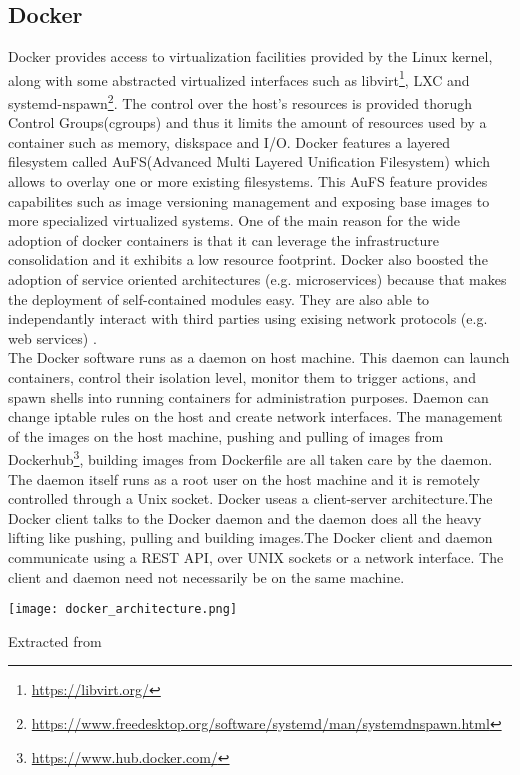 \subsection{Docker}
Docker provides access to virtualization facilities provided by the Linux kernel, along with some abstracted virtualized interfaces such as libvirt\footnote{\url{https://libvirt.org/}}, LXC and systemd-nspawn\footnote{\url{https://www.freedesktop.org/software/systemd/man/systemdnspawn.html}}. The control over the host's resources is provided thorugh Control Groups(cgroups) and thus it limits the amount of resources used by a container such as memory, diskspace and I/O. Docker features a layered filesystem called AuFS(Advanced Multi Layered Unification Filesystem) which allows to overlay one or more existing filesystems. This AuFS feature provides capabilites such as image versioning management and exposing base images to more specialized virtualized systems. One of the main reason for the wide adoption of docker containers is that it can leverage the infrastructure consolidation and it exhibits a low resource footprint. Docker also boosted the adoption of service oriented architectures (e.g. microservices) because that makes the deployment of self-contained modules easy. They are also able to independantly interact with third parties using exising network protocols (e.g. web services) \cite{Xavier:2013:PEC:2497369.2497577}. \\

The Docker software runs as a daemon on host machine. This daemon can launch containers, control their isolation level, monitor them to trigger actions, and spawn shells into running containers for administration purposes. Daemon can change iptable rules on the host and create network interfaces. The management of the images on the host machine, pushing and pulling of images from Dockerhub\footnote{\url{https://www.hub.docker.com/}}, building images from Dockerfile are all taken care by the daemon. The daemon itself runs as a root user on the host machine and it is remotely controlled through a Unix socket. Docker useas a client-server architecture.The Docker client talks to the Docker daemon and the daemon does all the heavy lifting like pushing, pulling and building images.The Docker client and daemon communicate using a REST API, over UNIX sockets or a network interface. The client and daemon need not necessarily be on the same machine\cite{docker-documentation}.

\begin{center}
\texttt{[image: docker\_architecture.png]}
\label{fig:docker_architecture}
\caption*{Extracted from \cite{docker-documentation}}
\end{center}

